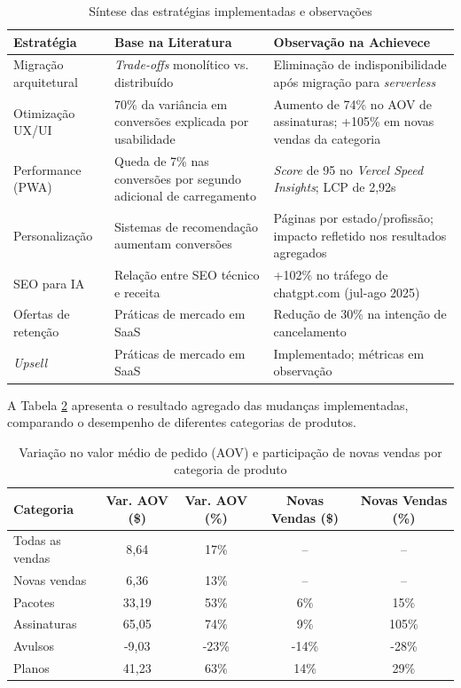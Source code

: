 \begin{table}[htb]
\centering
\caption{Síntese das estratégias implementadas e observações}
\label{tab:sintese}
\begin{tabular}{p{3cm}p{4.5cm}p{5.5cm}}
\hline
\textbf{Estratégia} & \textbf{Base na Literatura} & \textbf{Observação na Achievece} \\
\hline
Migração arquitetural & \textit{Trade-offs} monolítico vs. distribuído \cite{ubur_reviewing_2023} & Eliminação de indisponibilidade após migração para \textit{serverless} \\
\hline
Otimização UX/UI & 70\% da variância em conversões explicada por usabilidade \cite{nawir_impact_2024} & Aumento de 74\% no AOV de assinaturas; +105\% em novas vendas da categoria \\
\hline
Performance (PWA) & Queda de 7\% nas conversões por segundo adicional de carregamento \cite{bansal_seo_2024} & \textit{Score} de 95 no \textit{Vercel Speed Insights}; LCP de 2,92s \\
\hline
Personalização & Sistemas de recomendação aumentam conversões \cite{nguyen_personalized_2024} & Páginas por estado/profissão; impacto refletido nos resultados agregados \\
\hline
SEO para IA & Relação entre SEO técnico e receita \cite{bansal_seo_2024} & +102\% no tráfego de chatgpt.com (jul-ago 2025) \\
\hline
Ofertas de retenção & Práticas de mercado em SaaS & Redução de 30\% na intenção de cancelamento \\
\hline
\textit{Upsell} & Práticas de mercado em SaaS & Implementado; métricas em observação \\
\hline
\end{tabular}
\end{table}

A Tabela \ref{tab:aov-assinatura} apresenta o resultado agregado das mudanças implementadas, comparando o desempenho de diferentes categorias de produtos.

\begin{table}[htb]
\centering
\caption{Variação no valor médio de pedido (AOV) e participação de novas vendas por categoria de produto}
\label{tab:aov-assinatura}
\small
\begin{tabular}{lcccc}
\hline
\textbf{Categoria} & \textbf{Var. AOV (\$)} & \textbf{Var. AOV (\%)} & \textbf{Novas Vendas (\$)} & \textbf{Novas Vendas (\%)} \\
\hline
Todas as vendas & 8,64 & 17\% & -- & -- \\
Novas vendas & 6,36 & 13\% & -- & -- \\
Pacotes & 33,19 & 53\% & 6\% & 15\% \\
Assinaturas & 65,05 & 74\% & 9\% & 105\% \\
Avulsos & -9,03 & -23\% & -14\% & -28\% \\
Planos & 41,23 & 63\% & 14\% & 29\% \\
\hline
\end{tabular}
\end{table}

